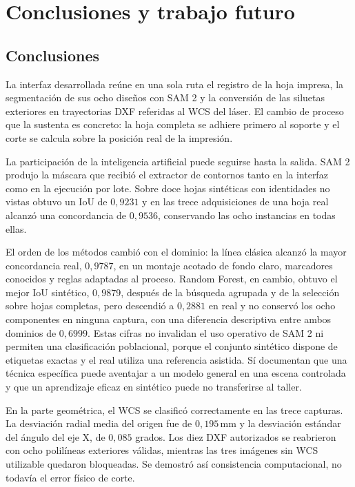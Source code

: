 \chapter{Conclusiones y trabajo futuro}
\label{cap:conclusiones}

\section{Conclusiones}

La interfaz desarrollada reúne en una sola ruta el registro de la hoja impresa, la segmentación de sus ocho diseños con SAM 2 y la conversión de las siluetas exteriores en trayectorias DXF referidas al WCS del láser. El cambio de proceso que la sustenta es concreto: la hoja completa se adhiere primero al soporte y el corte se calcula sobre la posición real de la impresión.

La participación de la inteligencia artificial puede seguirse hasta la salida. SAM 2 produjo la máscara que recibió el extractor de contornos tanto en la interfaz como en la ejecución por lote. Sobre doce hojas sintéticas con identidades no vistas obtuvo un IoU de $0{,}9231$ y en las trece adquisiciones de una hoja real alcanzó una concordancia de $0{,}9536$, conservando las ocho instancias en todas ellas.

El orden de los métodos cambió con el dominio: la línea clásica alcanzó la mayor concordancia real, $0{,}9787$, en un montaje acotado de fondo claro, marcadores conocidos y reglas adaptadas al proceso. Random Forest, en cambio, obtuvo el mejor IoU sintético, $0{,}9879$, después de la búsqueda agrupada y de la selección sobre hojas completas, pero descendió a $0{,}2881$ en real y no conservó los ocho componentes en ninguna captura, con una diferencia descriptiva entre ambos dominios de $0{,}6999$. Estas cifras no invalidan el uso operativo de SAM 2 ni permiten una clasificación poblacional, porque el conjunto sintético dispone de etiquetas exactas y el real utiliza una referencia asistida. Sí documentan que una técnica específica puede aventajar a un modelo general en una escena controlada y que un aprendizaje eficaz en sintético puede no transferirse al taller.

En la parte geométrica, el WCS se clasificó correctamente en las trece capturas. La desviación radial media del origen fue de $0{,}195\,\text{mm}$ y la desviación estándar del ángulo del eje X, de $0{,}085$ grados. Los diez DXF autorizados se reabrieron con ocho polilíneas exteriores válidas, mientras las tres imágenes sin WCS utilizable quedaron bloqueadas. Se demostró así consistencia computacional, no todavía el error físico de corte.

